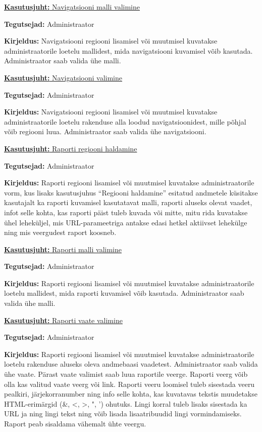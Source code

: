 \documentclass[a4paper,12pt]{article} %
\begin{document}
\underline{\textbf{Kasutusjuht:} Navigatsiooni malli valimine}
\par
\textbf{Tegutsejad:} Administraator
\par
\textbf{Kirjeldus:} Navigatsiooni regiooni lisamisel või muutmisel kuvatakse administraatorile loetelu mallidest, mida navigatsiooni kuvamisel võib kasutada. Administraator saab valida ühe malli.

\underline{\textbf{Kasutusjuht:} Navigatsiooni valimine}
\par
\textbf{Tegutsejad:} Administraator
\par
\textbf{Kirjeldus:} Navigatsiooni regiooni lisamisel või muutmisel kuvatakse administraatorile loetelu rakenduse alla loodud navigatsioonidest, mille põhjal võib regiooni luua. Administraator saab valida ühe navigatsiooni.

\underline{\textbf{Kasutusjuht:} Raporti regiooni haldamine}
\par
\textbf{Tegutsejad:} Administraator
\par
\textbf{Kirjeldus:} Raporti regiooni lisamisel või muutmisel kuvatakse administraatorile vorm, kus lisaks kasutusjuhus ``Regiooni haldamine'' esitatud andmetele küsitakse kasutajalt ka raporti kuvamisel kasutatavat malli, raporti aluseks olevat vaadet, infot selle kohta, kas raporti päist tuleb kuvada või mitte, mitu rida kuvatakse ühel leheküljel, mis URL-parameetriga antakse edasi hetkel aktiivset lehekülge ning mis veergudest raport koosneb.

\underline{\textbf{Kasutusjuht:} Raporti malli valimine}
\par
\textbf{Tegutsejad:} Administraator
\par
\textbf{Kirjeldus:}  Raporti regiooni lisamisel või muutmisel kuvatakse administraatorile loetelu mallidest, mida raporti kuvamisel võib kasutada. Administraator saab valida ühe malli.

\underline{\textbf{Kasutusjuht:} Raporti vaate valimine}
\par
\textbf{Tegutsejad:} Administraator
\par
\textbf{Kirjeldus:}  Raporti regiooni lisamisel või muutmisel kuvatakse administraatorile loetelu rakenduse aluseks oleva andmebaasi vaadetest. Administraator saab valida ühe vaate. Pärast vaate valimist saab luua raportile veerge. Raporti veerg võib olla kas valitud vaate veerg või link. Raporti veeru loomisel tuleb sisestada veeru pealkiri, järjekorranumber ning info selle kohta, kas kuvatavas tekstis muudetakse HTML-erimärgid (\&, <, >, ", ') ohutuks. Lingi korral tuleb lisaks sisestada ka URL ja ning lingi tekst ning võib lisada lisaatribuudid lingi vormindamiseks. Raport peab sisaldama vähemalt ühte veergu.
\end{document}
